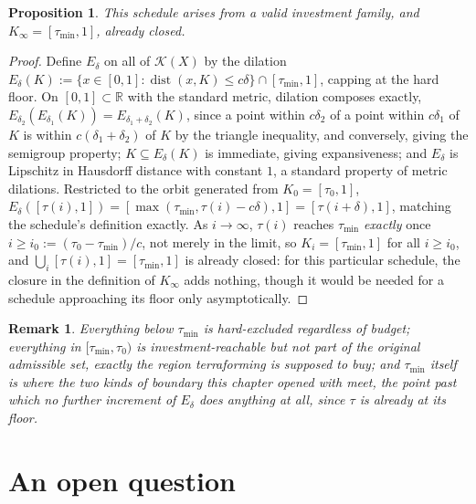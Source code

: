\documentclass[11pt]{report}
\newtheorem{proposition}{Proposition}[chapter]
\newtheorem{remark}{Remark}[chapter]
\begin{document}
\begin{proposition}
This schedule arises from a valid investment family, and
$K_\infty = [\tau_{\min}, 1]$, already closed.
\end{proposition}
\begin{proof}
Define $E_\delta$ on all of $\mathcal{K}(X)$ by the dilation
$E_\delta(K) := \{x \in [0,1] : \operatorname{dist}(x,K) \leq c\delta\}
\cap [\tau_{\min}, 1]$, capping at the hard floor. On $[0,1] \subset
\mathbb{R}$ with the standard metric, dilation composes exactly,
$E_{\delta_2}(E_{\delta_1}(K)) = E_{\delta_1+\delta_2}(K)$, since a
point within $c\delta_2$ of a point within $c\delta_1$ of $K$ is
within $c(\delta_1+\delta_2)$ of $K$ by the triangle inequality, and
conversely, giving the semigroup property; $K \subseteq E_\delta(K)$
is immediate, giving expansiveness; and $E_\delta$ is Lipschitz in
Hausdorff distance with constant $1$, a standard property of metric
dilations. Restricted to the orbit generated from $K_0 = [\tau_0,1]$,
$E_\delta([\tau(i),1]) = [\max(\tau_{\min}, \tau(i) - c\delta), 1] =
[\tau(i+\delta), 1]$, matching the schedule's definition exactly. As
$i \to \infty$, $\tau(i)$ reaches $\tau_{\min}$ \emph{exactly} once $i
\geq i_0 := (\tau_0 - \tau_{\min})/c$, not merely in the limit, so
$K_i = [\tau_{\min},1]$ for all $i \geq i_0$, and
$\bigcup_i [\tau(i),1] = [\tau_{\min},1]$ is already closed: for this
particular schedule, the closure in the definition of $K_\infty$ adds
nothing, though it would be needed for a schedule approaching its
floor only asymptotically.
\end{proof}

\begin{remark}
Everything below $\tau_{\min}$ is hard-excluded regardless of budget;
everything in $[\tau_{\min}, \tau_0)$ is investment-reachable but not
part of the original admissible set, exactly the region terraforming
is supposed to buy; and $\tau_{\min}$ itself is where the two kinds of
boundary this chapter opened with meet, the point past which no
further increment of $E_\delta$ does anything at all, since $\tau$ is
already at its floor.
\end{remark}

\section*{An open question}
\end{document}
